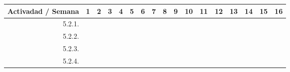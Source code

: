 \documentclass[12pt]{article}
\begin{document}
\begin{table}[H]
{\begin{tabular}{|rllllllllllllllll|}
        \multicolumn{1}{|l|}{\cellcolor[HTML]{D9D9D9}Activadad / Semana} & \multicolumn{1}{c|}{\cellcolor[HTML]{B6D7A8}1} & \multicolumn{1}{c|}{\cellcolor[HTML]{B6D7A8}2} & \multicolumn{1}{c|}{\cellcolor[HTML]{B6D7A8}3} & \multicolumn{1}{c|}{\cellcolor[HTML]{B6D7A8}4} & \multicolumn{1}{c|}{\cellcolor[HTML]{A4C2F4}5} & \multicolumn{1}{c|}{\cellcolor[HTML]{A4C2F4}6} & \multicolumn{1}{c|}{\cellcolor[HTML]{A4C2F4}7} & \multicolumn{1}{c|}{\cellcolor[HTML]{A4C2F4}8} & \multicolumn{1}{c|}{\cellcolor[HTML]{B4A7D6}9} & \multicolumn{1}{c|}{\cellcolor[HTML]{B4A7D6}10} & \multicolumn{1}{c|}{\cellcolor[HTML]{B4A7D6}11} & \multicolumn{1}{c|}{\cellcolor[HTML]{B4A7D6}12} & \multicolumn{1}{c|}{\cellcolor[HTML]{EA9999}13} & \multicolumn{1}{c|}{\cellcolor[HTML]{EA9999}14} & \multicolumn{1}{c|}{\cellcolor[HTML]{EA9999}15} & \multicolumn{1}{c|}{\cellcolor[HTML]{EA9999}16} \\ \hline
        \multicolumn{1}{|r|}{5.2.1.} & \multicolumn{1}{l|}{} & \multicolumn{1}{l|}{} & \multicolumn{1}{l|}{} & \multicolumn{1}{c|}{\cellcolor[HTML]{B6D7A8}} & \multicolumn{1}{l|}{} & \multicolumn{1}{l|}{} & \multicolumn{1}{l|}{} & \multicolumn{1}{l|}{} & \multicolumn{1}{l|}{} & \multicolumn{1}{l|}{} & \multicolumn{1}{l|}{} & \multicolumn{1}{l|}{} & \multicolumn{1}{l|}{} & \multicolumn{1}{l|}{} & \multicolumn{1}{l|}{} &  \\ \hline
        \multicolumn{1}{|r|}{5.2.2.} & \multicolumn{1}{l|}{} & \multicolumn{1}{l|}{} & \multicolumn{1}{l|}{} & \multicolumn{1}{c|}{\cellcolor[HTML]{B6D7A8}} & \multicolumn{1}{c|}{\cellcolor[HTML]{A4C2F4}} & \multicolumn{1}{l|}{} & \multicolumn{1}{l|}{} & \multicolumn{1}{l|}{} & \multicolumn{1}{l|}{} & \multicolumn{1}{l|}{} & \multicolumn{1}{l|}{} & \multicolumn{1}{l|}{} & \multicolumn{1}{l|}{} & \multicolumn{1}{l|}{} & \multicolumn{1}{l|}{} &  \\ \hline
        \multicolumn{1}{|r|}{5.2.3.} & \multicolumn{1}{l|}{} & \multicolumn{1}{l|}{} & \multicolumn{1}{l|}{} & \multicolumn{1}{l|}{} & \multicolumn{1}{c|}{\cellcolor[HTML]{A4C2F4}} & \multicolumn{1}{c|}{\cellcolor[HTML]{A4C2F4}} & \multicolumn{1}{c|}{\cellcolor[HTML]{A4C2F4}} & \multicolumn{1}{l|}{} & \multicolumn{1}{l|}{} & \multicolumn{1}{l|}{} & \multicolumn{1}{l|}{} & \multicolumn{1}{l|}{} & \multicolumn{1}{l|}{} & \multicolumn{1}{l|}{} & \multicolumn{1}{l|}{} &  \\ \hline
        \multicolumn{1}{|r|}{5.2.4.} & \multicolumn{1}{l|}{} & \multicolumn{1}{l|}{} & \multicolumn{1}{l|}{} & \multicolumn{1}{l|}{} & \multicolumn{1}{c|}{\cellcolor[HTML]{A4C2F4}} & \multicolumn{1}{c|}{\cellcolor[HTML]{A4C2F4}} & \multicolumn{1}{c|}{\cellcolor[HTML]{A4C2F4}} & \multicolumn{1}{l|}{} & \multicolumn{1}{l|}{} & \multicolumn{1}{l|}{} & \multicolumn{1}{l|}{} & \multicolumn{1}{l|}{} & \multicolumn{1}{l|}{} & \multicolumn{1}{l|}{} & \multicolumn{1}{l|}{} &  \\ \hline

\end{tabular}}
\end{table}
\end{document}
